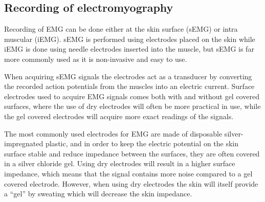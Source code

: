 \subsection{Recording of electromyography}

Recording of EMG can be done either at the skin surface (sEMG) or intra muscular (iEMG). sEMG is performed using electrodes placed on the skin while iEMG is done using needle electrodes inserted into the muscle, but sEMG is far more commonly used as it is non-invasive and easy to use. \cite{cram2012}  

When acquiring sEMG signals the electrodes act as a transducer by converting the recorded action potentials from the muscles into an electric current. Surface electrodes used to acquire EMG signals comes both with and without gel covered surfaces, where the use of dry electrodes will often be more practical in use, while the gel covered electrodes will acquire more exact readings of the signals. \cite{lee2008, cram2012}

The most commonly used electrodes for EMG are made of disposable silver-impregnated plastic, and in order to keep the electric potential on the skin surface stable and reduce impedance between the surfaces, they are often covered in a silver chloride gel. Using dry electrodes will result in a higher surface impedance, which means that the signal contains more noise compared to a gel covered electrode. However, when using dry electrodes the skin will itself provide a “gel” by sweating which will decrease the skin impedance. \cite{cram2012}



